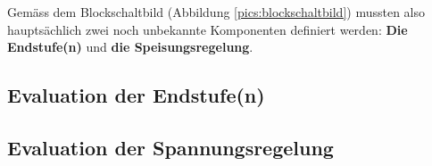 Gemäss dem Blockschaltbild (Abbildung \ref{pics:blockschaltbild}) mussten also hauptsächlich zwei noch unbekannte Komponenten definiert werden: \textbf{Die Endstufe(n)} und \textbf{die Speisungsregelung}.
\subsection{Evaluation der Endstufe(n)}

\subsection{Evaluation der Spannungsregelung}
